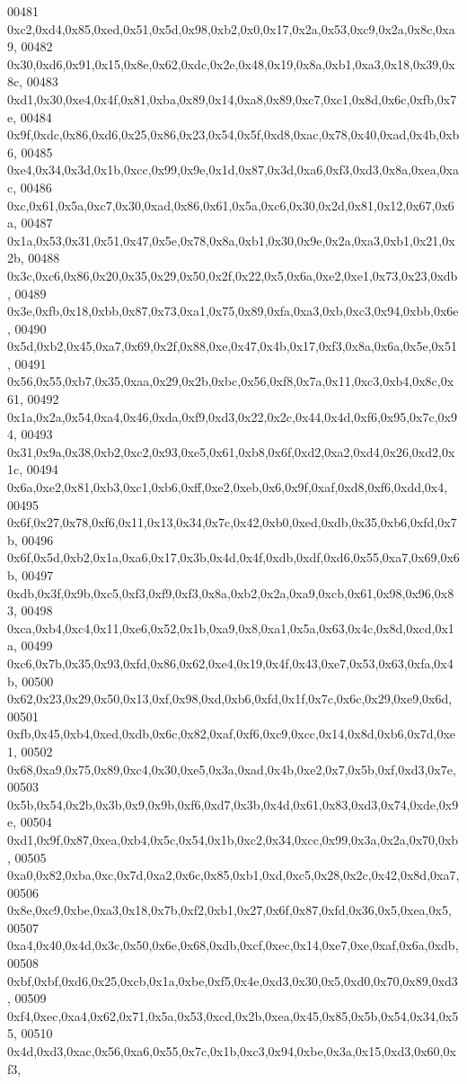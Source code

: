 \begin{DoxyCode}
00481   0xc2,0xd4,0x85,0xed,0x51,0x5d,0x98,0xb2,0x0,0x17,0x2a,0x53,0xc9,0x2a,0x8c,0xa9,
00482   0x30,0xd6,0x91,0x15,0x8e,0x62,0xdc,0x2e,0x48,0x19,0x8a,0xb1,0xa3,0x18,0x39,0x8c,
00483   0xd1,0x30,0xe4,0x4f,0x81,0xba,0x89,0x14,0xa8,0x89,0xc7,0xc1,0x8d,0x6c,0xfb,0x7e,
00484   0x9f,0xdc,0x86,0xd6,0x25,0x86,0x23,0x54,0x5f,0xd8,0xac,0x78,0x40,0xad,0x4b,0xb6,
00485   0xe4,0x34,0x3d,0x1b,0xcc,0x99,0x9e,0x1d,0x87,0x3d,0xa6,0xf3,0xd3,0x8a,0xea,0xac,
00486   0xc,0x61,0x5a,0xc7,0x30,0xad,0x86,0x61,0x5a,0xc6,0x30,0x2d,0x81,0x12,0x67,0x6a,
00487   0x1a,0x53,0x31,0x51,0x47,0x5e,0x78,0x8a,0xb1,0x30,0x9e,0x2a,0xa3,0xb1,0x21,0x2b,
00488   0x3c,0xc6,0x86,0x20,0x35,0x29,0x50,0x2f,0x22,0x5,0x6a,0xe2,0xe1,0x73,0x23,0xdb,
00489   0x3e,0xfb,0x18,0xbb,0x87,0x73,0xa1,0x75,0x89,0xfa,0xa3,0xb,0xc3,0x94,0xbb,0x6e,
00490   0x5d,0xb2,0x45,0xa7,0x69,0x2f,0x88,0xe,0x47,0x4b,0x17,0xf3,0x8a,0x6a,0x5e,0x51,
00491   0x56,0x55,0xb7,0x35,0xaa,0x29,0x2b,0xbc,0x56,0xf8,0x7a,0x11,0xc3,0xb4,0x8c,0x61,
00492   0x1a,0x2a,0x54,0xa4,0x46,0xda,0xf9,0xd3,0x22,0x2c,0x44,0x4d,0xf6,0x95,0x7c,0x94,
00493   0x31,0x9a,0x38,0xb2,0xc2,0x93,0xe5,0x61,0xb8,0x6f,0xd2,0xa2,0xd4,0x26,0xd2,0x1c,
00494   0x6a,0xe2,0x81,0xb3,0xc1,0xb6,0xff,0xe2,0xeb,0x6,0x9f,0xaf,0xd8,0xf6,0xdd,0x4,
00495   0x6f,0x27,0x78,0xf6,0x11,0x13,0x34,0x7c,0x42,0xb0,0xed,0xdb,0x35,0xb6,0xfd,0x7b,
00496   0x6f,0x5d,0xb2,0x1a,0xa6,0x17,0x3b,0x4d,0x4f,0xdb,0xdf,0xd6,0x55,0xa7,0x69,0x6b,
00497   0xdb,0x3f,0x9b,0xc5,0xf3,0xf9,0xf3,0x8a,0xb2,0x2a,0xa9,0xcb,0x61,0x98,0x96,0x83,
00498   0xca,0xb4,0xc4,0x11,0xe6,0x52,0x1b,0xa9,0x8,0xa1,0x5a,0x63,0x4c,0x8d,0xcd,0x1a,
00499   0xc6,0x7b,0x35,0x93,0xfd,0x86,0x62,0xe4,0x19,0x4f,0x43,0xe7,0x53,0x63,0xfa,0x4b,
00500   0x62,0x23,0x29,0x50,0x13,0xf,0x98,0xd,0xb6,0xfd,0x1f,0x7c,0x6c,0x29,0xe9,0x6d,
00501   0xfb,0x45,0xb4,0xed,0xdb,0x6c,0x82,0xaf,0xf6,0xc9,0xcc,0x14,0x8d,0xb6,0x7d,0xe1,
00502   0x68,0xa9,0x75,0x89,0xc4,0x30,0xe5,0x3a,0xad,0x4b,0xe2,0x7,0x5b,0xf,0xd3,0x7e,
00503   0x5b,0x54,0x2b,0x3b,0x9,0x9b,0xf6,0xd7,0x3b,0x4d,0x61,0x83,0xd3,0x74,0xde,0x9e,
00504   0xd1,0x9f,0x87,0xea,0xb4,0x5c,0x54,0x1b,0xc2,0x34,0xcc,0x99,0x3a,0x2a,0x70,0xb,
00505   0xa0,0x82,0xba,0xc,0x7d,0xa2,0x6c,0x85,0xb1,0xd,0xc5,0x28,0x2c,0x42,0x8d,0xa7,
00506   0x8e,0xc9,0xbe,0xa3,0x18,0x7b,0xf2,0xb1,0x27,0x6f,0x87,0xfd,0x36,0x5,0xea,0x5,
00507   0xa4,0x40,0x4d,0x3c,0x50,0x6e,0x68,0xdb,0xcf,0xec,0x14,0xe7,0xe,0xaf,0x6a,0xdb,
00508   0xbf,0xbf,0xd6,0x25,0xcb,0x1a,0xbe,0xf5,0x4e,0xd3,0x30,0x5,0xd0,0x70,0x89,0xd3,
00509   0xf4,0xec,0xa4,0x62,0x71,0x5a,0x53,0xcd,0x2b,0xea,0x45,0x85,0x5b,0x54,0x34,0x55,
00510   0x4d,0xd3,0xac,0x56,0xa6,0x55,0x7c,0x1b,0xc3,0x94,0xbe,0x3a,0x15,0xd3,0x60,0xf3,

\end{DoxyCode}
